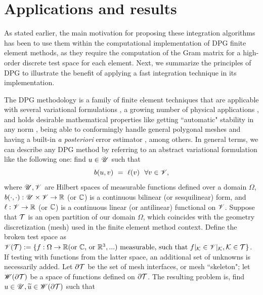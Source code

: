 \section{Applications and results}
% 
As stated earlier, the main motivation for proposing these integration algorithms has been to use them within the computational implementation of DPG finite element methods, as they require the computation of the Gram matrix for a high-order discrete test space for each element. Next, we summarize the principles of DPG to illustrate the benefit of applying a fast integration technique in its implementation.

The DPG methodology is a family of finite element techniques that are applicable with several variational formulations \cite{DPGOverview}, a growing number of physical applications \cite{roberts2013discontinuous,HellwigThesis, demkowicz2016spacetime,Keith16,petrides2017adaptive,KeithOldroydB,FuentesViscoelasticity}, and holds desirable mathematical properties like getting ``automatic" stability in any norm \cite{demkowicz2011class}, being able to conformingly handle general polygonal meshes \cite{polydpg2017} and having a built-in \textit{a posteriori} error estimator \cite{demkowicz2012class,carstensen2014posteriori}, among others. In general terms, we can describe any DPG method by referring to an abstract variational formulation like the following one: find $u\in\mathscr{U}$ such that
% 
\begin{equation}
    b(u,v)\ =\ \ell(v)\ \ \forall v\in\mathscr{V},
\end{equation}
%
where $\mathscr{U},\mathscr{V}$ are Hilbert spaces of measurable functions defined over a domain $\Omega$, $b(\cdot,\cdot):\mathscr{U}\times\mathscr{V}\rightarrow\mathbb{R}$ (or $\mathbb{C}$) is a continuous bilinear (or sesquilinear) form, and $\ell:\mathscr{V}\rightarrow\mathbb{R}$ (or $\mathbb{C}$) is a continuous linear (or antilinear) functional on $\mathscr{V}$. Suppose that $\mathcal{T}$ is an open partition of our domain $\Omega$, which coincides with the geometry discretization (mesh) used in the finite element method context. Define the broken test space as $\mathscr{V}(\mathcal{T}):=\{f:\Omega\rightarrow\mathbb{R} (\text{or }\mathbb{C}\text{, or }\mathbb{R}^3,...)\text{ measurable, such that }f|_{\mathcal{K}}\in\mathscr{V}|_{\mathcal{K}},\mathcal{K}\in\mathcal{T}\}$. If testing with functions from the latter space, an additional set of unknowns is necessarily added. Let $\partial\mathcal{T}$ be the set of mesh interfaces, or mesh ``skeleton"; let $\mathscr{W}(\partial\mathcal{T})$ be a space of functions defined on $\partial\mathcal{T}$. The resulting problem is, find $u\in\mathscr{U}, \widetilde{u}\in\mathscr{W}(\partial\mathcal{T})$ such that
